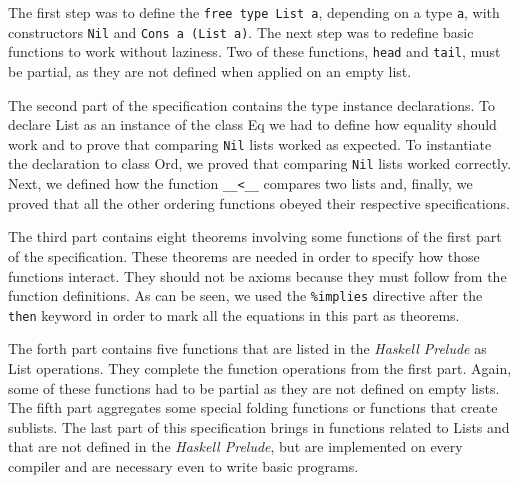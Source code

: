 \documentclass[12pt,twoside]{article}
\numberwithin{spec}{subsection}
\numberwithin{proof}{subsection}
\numberwithin{figure}{subsection}
\numberwithin{code}{subsection}
\begin{document}
The first step was to define the \verb.free type List a., depending on a type \verb.a., with constructors \verb.Nil. and \verb.Cons a (List a).. The next step was to redefine basic functions to work without laziness. Two of these functions, \verb.head. and \verb.tail., must be partial, as they are not defined when applied on an empty list.

The second part of the specification contains the type instance declarations. To declare List as an instance of the class Eq we had to define how equality should work and to prove that comparing \verb.Nil. lists worked as expected. To instantiate the declaration to class Ord, we proved that comparing \verb.Nil. lists worked correctly. Next, we defined how the function \verb.__<__. compares two lists and, finally, we proved that all the other ordering functions obeyed their respective specifications.

The third part contains eight theorems involving some functions of the first part of the specification. These theorems are needed in order to specify how those functions interact. They should not be axioms because they must follow from the function definitions. As can be seen, we used the \verb.%implies. directive after the \verb.then. keyword in order to mark all the equations in this part as theorems.

The forth part contains five functions that are listed in the \textit{Haskell Prelude} as List operations. They complete the function operations from the first part. Again, some of these functions had to be partial as they are not defined on empty lists. The fifth part aggregates some special folding functions or functions that create sublists. The last part of this specification brings in functions related to Lists and that are not defined in the \textit{Haskell Prelude}, but are implemented on every compiler and are necessary even to write basic programs.
\end{document}
